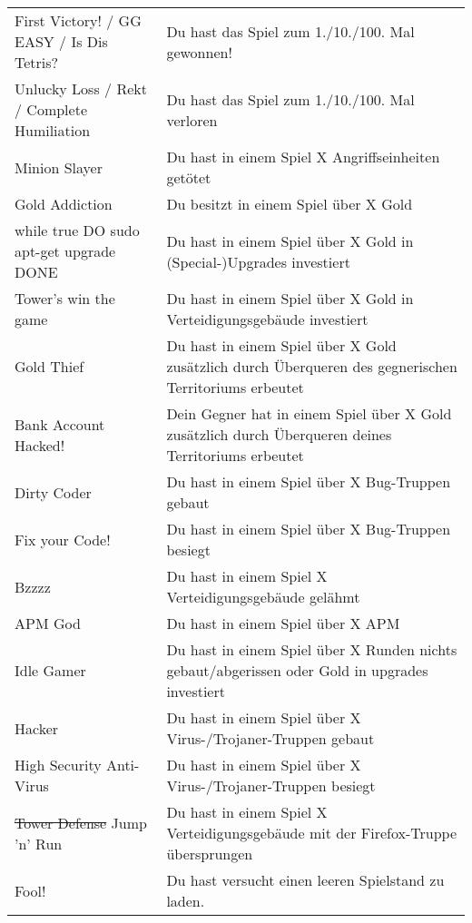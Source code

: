 \begin{table}[ht]
\begin{longtabu}{X[-1]X}
    First Victory! / GG EASY / Is Dis Tetris?
      & Du hast das Spiel zum 1./10./100. Mal gewonnen!
      	\\
    Unlucky Loss / Rekt / Complete Humiliation
    	& Du hast das Spiel zum 1./10./100. Mal verloren
    	\\
	Minion Slayer
		& Du hast in einem Spiel X Angriffseinheiten getötet
		\\
	Gold Addiction
		& Du besitzt in einem Spiel über X Gold
		\\
	while true DO sudo apt-get upgrade DONE
		& Du hast in einem Spiel über X Gold in (Special-)Upgrades investiert
		\\
	Tower's win the game
		& Du hast in einem Spiel über X Gold in Verteidigungsgebäude investiert
		\\
	Gold Thief
		& Du hast in einem Spiel über X Gold zusätzlich durch Überqueren des gegnerischen
		Territoriums erbeutet
		\\
	Bank Account Hacked!
		& Dein Gegner hat in einem Spiel über X Gold zusätzlich durch Überqueren deines
		Territoriums erbeutet
		\\
	Dirty Coder
		& Du hast in einem Spiel über X Bug-Truppen gebaut
		\\
	Fix your Code!
		& Du hast in einem Spiel über X Bug-Truppen besiegt
		\\
	Bzzzz
		& Du hast in einem Spiel X Verteidigungsgebäude gelähmt
		\\
	APM God
		& Du hast in einem Spiel über X APM
		\\
	Idle Gamer
		& Du hast in einem Spiel über X Runden nichts gebaut/abgerissen oder Gold in upgrades investiert
		\\
	Hacker
		& Du hast in einem Spiel über X Virus-/Trojaner-Truppen gebaut
		\\
	High Security Anti-Virus
		& Du hast in einem Spiel über X Virus-/Trojaner-Truppen besiegt
		\\
	\st{Tower Defense} Jump 'n' Run
		& Du hast in einem Spiel X Verteidigungsgebäude mit der Firefox-Truppe übersprungen
		\\
	Fool!
		& Du hast versucht einen leeren Spielstand zu laden.
		\\
    \bottomrule
  \end{longtabu}
\end{table}
